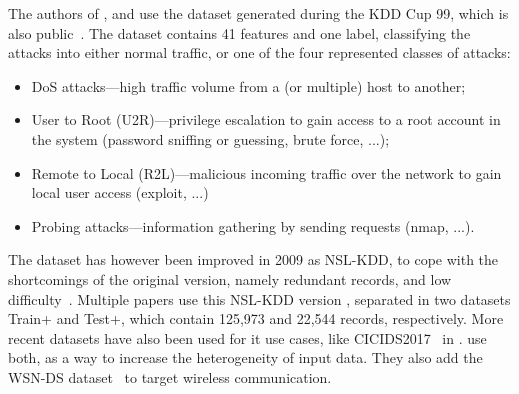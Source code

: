 The authors of \cite{chen_Networkanomalydetection_2020}, \cite{hei_trustedfeatureaggregator_2020} and \cite{liu_BlockchainFederatedLearning_2021} use the dataset generated during the KDD Cup 99, which is also public~\cite{al-athbaal-kddcup99}.
The dataset contains 41 features and one label, classifying the attacks into either normal traffic, or one of the four represented classes of attacks:
\begin{itemize}
    \item DoS attacks---high traffic volume from a (or multiple) host to another;
    \item User to Root (U2R)---privilege escalation to gain access to a root account in the system (password sniffing or guessing, brute force, ...);
    \item Remote to Local (R2L)---malicious incoming traffic over the network to gain local user access (exploit, ...)
    \item Probing attacks---information gathering by sending requests (nmap, ...).
\end{itemize}
The dataset has however been improved in 2009 as NSL-KDD, to cope with the shortcomings of the original version, namely redundant records, and low difficulty~\cite{Tavallaee2009}.
Multiple papers use this NSL-KDD version \cite{rathore_BlockSecIoTNetBlockchainbaseddecentralized_2019,fan_IoTDefenderFederatedTransfer_2020,rahman_InternetThingsIntrusion_2020,qin_FederatedLearningBasedNetwork_2021,al-athbaal-marri_FederatedMimicLearning_2020,kim_CollaborativeAnomalyDetection_2020}, separated in two datasets Train+ and Test+, which contain 125,973 and 22,544 records, respectively.
More recent datasets have also been used for \gls{it} use cases, like CICIDS2017~\cite{Sharafaldin2018} in \cite{fan_IoTDefenderFederatedTransfer_2020,zhao_MultiTaskNetworkAnomaly_2019,qin_LineSpeedScalableIntrusion_2020a}.
\textcite{chen_Networkanomalydetection_2020b} use both, as a way to increase the heterogeneity of input data.
They also add the WSN-DS dataset~\cite{Almomani2016} to target wireless communication.

